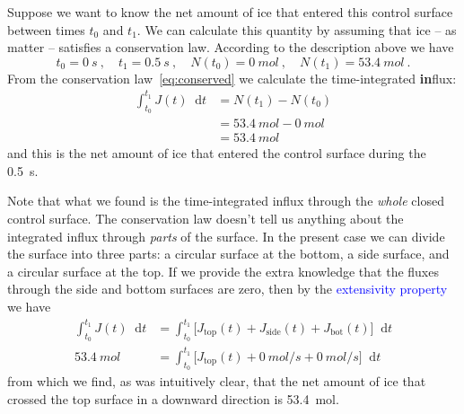 \documentclass[a4paper,12pt,%
onecolumn,oneside,%
british%
]{memoir}
\newcommand*{\di}{\mathop{}\!\mathrm{d}}%
\renewcommand*{\|}[1][]{\nonscript\:#1\vert\nonscript\:\mathopen{}}
\newcommand*{\sect}{\S}%
\renewcommand*{\autoref}[3][\sect\,\ref]{\textcolor{blue}{#3}
\raisebox{0.6ex}{\color{blue}\miniscule%
\faIcon{angle-right}%
\;#1{#2}\;p.\,\pageref{#2}}}
\newcommand*{\yti}{t_{0}}
\newcommand*{\ytf}{t_{1}}
\newcommand*{\dt}{\di t}
\newcommand*{\yN}{N}
\newcommand*{\yJ}{J}
\begin{document}
Suppose we want to know the net amount of ice that entered this control surface between times $\yti$ and $\ytf$. We can calculate this quantity by assuming that ice -- as matter -- satisfies a conservation law.
According to the description above we have
\begin{equation*}
  \yti=\qty{0}{s} \ ,\quad
  \ytf=\qty{0.5}{s} \ ,\quad
  \yN(\yti)=\qty{0}{mol} \ ,\quad
  \yN(\ytf)=\qty{53.4}{mol} \ .
\end{equation*}
From the conservation law~\eqref{eq:conserved} we calculate the time-integrated \textbf{in}flux:
\begin{equation*}
  \begin{split}
    \int_{\yti}^{\ytf}\!\!\yJ(t)\dt &= \yN(\ytf) - \yN(\yti)
    \\&= \qty{53.4}{mol} - \qty{0}{mol}
    \\&= \qty{53.4}{mol}
  \end{split}
\end{equation*}
and this is the net amount of ice that entered the control surface during the \qty{0.5}{s}.

Note that what we found is the time-integrated influx through the \emph{whole} closed control surface. The conservation law doesn't tell us anything about the integrated influx through \emph{parts} of the surface. In the present case we can divide the surface into three parts: a circular surface at the bottom, a side surface, and a circular surface at the top. If we provide the extra knowledge that the fluxes through the side and bottom surfaces are zero, then by the \autoref{def:extensivity}{extensivity property} we have
\begin{equation*}
  \begin{split}
    \int_{\yti}^{\ytf}\!\!\yJ(t)\dt &=
    \int_{\yti}^{\ytf}\!\bigl[\yJ_{\textrm{top}}(t) +
    \yJ_{\text{side}}(t) +
    \yJ_{\textrm{bot}}(t)\bigr]\dt
    \\
      \qty{53.4}{mol} &=
      \int_{\yti}^{\ytf}\!\bigl[\yJ_{\textrm{top}}(t) +
      \qty{0}{mol/s} +
      \qty{0}{mol/s}\bigr]\dt
  \end{split}
\end{equation*}
from which we find, as was intuitively clear, that the net amount of ice that crossed the top surface in a downward direction is \qty{53.4}{mol}.


\bigskip
\end{document}
